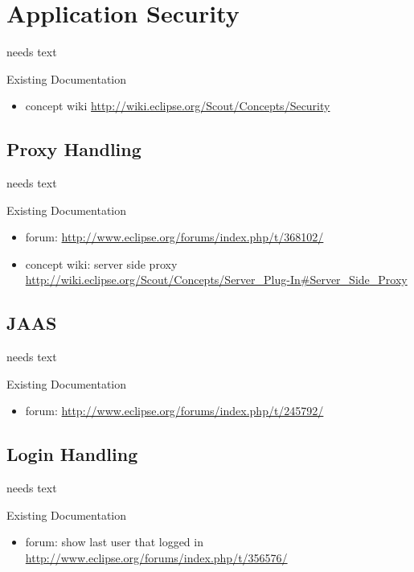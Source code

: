 \documentclass[a4paper,10pt,twoside]{book}
\begin{document}
  \sloppy
\fi

\chapter{Application Security}
needs text

\noindent Existing Documentation
\begin{itemize}
  \item concept wiki \url{http://wiki.eclipse.org/Scout/Concepts/Security}
\end{itemize}

\section{Proxy Handling}
needs text

\noindent Existing Documentation
\begin{itemize}
  \item forum: \url{http://www.eclipse.org/forums/index.php/t/368102/}
  \item concept wiki: server side proxy \url{http://wiki.eclipse.org/Scout/Concepts/Server_Plug-In\#Server_Side_Proxy}
\end{itemize}

\section{JAAS}
needs text

\noindent Existing Documentation
\begin{itemize}
  \item forum: \url{http://www.eclipse.org/forums/index.php/t/245792/}
\end{itemize}

\section{Login Handling}
needs text

\noindent Existing Documentation
\begin{itemize}
  \item forum: show last user that logged in \url{http://www.eclipse.org/forums/index.php/t/356576/}
\end{itemize}
\end{document}
